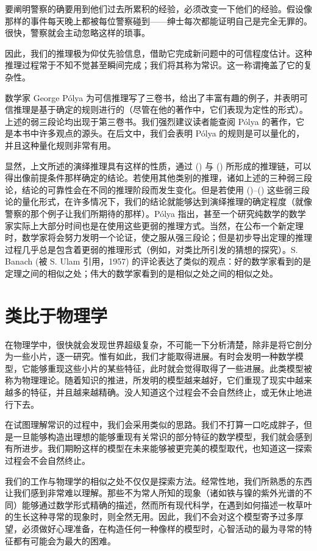 要阐明警察的确要用到他们过去所累积的经验，必须改变一下他们的经验。假设像那样的事件每天晚上都被每位警察碰到——绅士每次都能证明自己是完全无罪的。很快，警察就会主动忽略这样的琐事。

因此，我们的推理极为仰仗先验信息，借助它完成新问题中的可信程度估计。这种推理过程常于不知不觉甚至瞬间完成；我们将其称为常识。这一称谓掩盖了它的复杂性。

数学家 George Pólya 为可信推理写了三卷书，给出了丰富有趣的例子，并表明可信推理是基于确定的规则进行的（尽管在他的著作中，它们表现为定性的形式）。上述的弱三段论均出现于第三卷书。我们强烈建议读者能查阅 Pólya 的著作，它是本书中许多观点的源头。在后文中，我们会表明 Pólya 的规则是可以量化的，并且这种量化规则非常有用。

显然，上文所述的演绎推理具有这样的性质，通过 (\in[syllogism-1]) 与 (\in[syllogism-2]) 所形成的推理链，可以得出像前提条件那样确定的结论。若使用其他类别的推理，诸如上述的三种弱三段论，结论的可靠性会在不同的推理阶段而发生变化。但是若使用 (\in[weak-1])--(\in[weak-3]) 这些弱三段论的量化形式，在许多情况下，我们的结论就能够达到演绎推理的确定程度（就像警察的那个例子让我们所期待的那样）。Pólya 指出，甚至一个研究纯数学的数学家实际上大部分时间也是在使用这些更弱的推理方式。当然，在公布一个新定理时，数学家将会努力发明一个论证，使之服从强三段论；但是初步导出定理的推理过程几乎总是包含着更弱的推理形式（例如，对类比所引发的猜想的探究）。S. Banach (被 S. Ulam 引用，1957) 的评论表达了类似的观点：好的数学家看到的是定理之间的相似之处；伟大的数学家看到的是相似之处之间的相似之处。

\section{类比于物理学}

在物理学中，很快就会发现世界超级复杂，不可能一下分析清楚，除非是将它剖分为一些小片，逐一研究。惟有如此，我们才能取得进展。有时会发明一种数学模型，它能够重现这些小片的某些特征，此时就会觉得取得了一些进展。此类模型被称为物理理论。随着知识的推进，所发明的模型越来越好，它们重现了现实中越来越多的特征，并且越来越精确。没人知道这个过程会不会自然终止，或无休止地进行下去。

在试图理解常识的过程中，我们会采用类似的思路。我们不打算一口吃成胖子，但是一旦能够构造出理想的能够重现有关常识的部分特征的数学模型，我们就会感到有所进步。我们期盼这样的模型在未来能够被更完美的模型取代，也知道这一探索过程会不会自然终止。

我们的工作与物理学的相似之处不仅仅是探索方法。经常性地，我们所熟悉的东西让我们感到非常难以理解。那些不为常人所知的现象（诸如铁与镍的紫外光谱的不同）能够通过数学形式精确的描述，然而所有现代科学，在遇到如何描述一枚草叶的生长这种寻常的现象时，则全然无用。因此，我们不会对这个模型寄予过多厚望，必须做好心理准备，在构造任何一种像样的模型时，心智活动的最为寻常的特征都有可能会为最大的困难。

